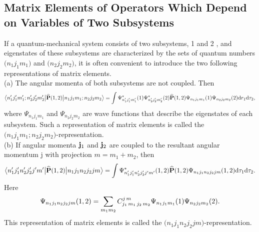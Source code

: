 \subsection{Matrix Elements of Operators Which Depend on Variables of Two Subsystems}\label{sec:13.1.4}
If a quantum-mechanical system consists of two subsystems, 1 and 2 , and eigenstates of these subsystems are characterized by the sets of quantum numbers \(\bigl(n_{1} j_{1} m_{1}\bigr)\) and \(\bigl(n_{2} j_{2} m_{2}\bigr)\), it is often convenient to introduce the two following representations of matrix elements.\\
(a) The angular momenta of both subsystems are not coupled. Then
\begin{equation}
\bigl\langle n_{1}^{\prime} j_{1}^{\prime} m_{1}^{\prime} ; n_{2}^{\prime} j_{2}^{\prime} m_{2}^{\prime} \big| \widehat{\mathbf{P}}(1,2) \big| n_{1} j_{1} m_{1} ; n_{2} j_{2} m_{2} \bigr\rangle
=\int \Psi_{n_{1}^{\prime} j_{1}^{\prime} m_{1}^{\prime}}^{*}(1) \Psi_{n_{2}^{\prime} j_{2}^{\prime} m_{2}^{\prime}}^{*}(2) \widehat{\mathbf{P}}(1,2) \Psi_{n_{1} j_{1} m_{1}}(1) \Psi_{n_{2} j_{2} m_{2}}(2) \mathrm{d} r_{1} \mathrm{d} \tau_{2}, \label{eq:13:1:20}
\end{equation}
where \(\Psi_{n_{1} j_{1} m_{1}}\) and \(\Psi_{n_{2} j_{2} m_{2}}\) are wave functions that describe the eigenstates of each subsystem. Such a representation of matrix elements is called the \(\bigl(n_{1} j_{1} m_{1} ; n_{2} j_{2} m_{2}\bigr)\)-representation.\\
(b) If angular momenta \(\mathbf{j}_{1}\) and \(\mathbf{j}_{2}\) are coupled to the resultant angular momentum j with projection \(m= m_{1}+m_{2}\), then
\begin{equation}
\bigl\langle  n_{1}^{\prime} j_{1}^{\prime} n_{2}^{\prime} j_{2}^{\prime} j^{\prime} m^{\prime} \big| \widehat{\mathbf{P}}(1,2) \big| n_{1} j_{1} n_{2} j_{2} j m \bigr\rangle=\int \Psi_{n_{1}^{\prime} j_{1}^{\prime} n_{2}^{\prime} j_{2}^{\prime} j^{\prime} m^{\prime}}^{*}(1,2) \widehat{\mathbf{P}}(1,2) \Psi_{n_{1} j_{1} n_{2} j_{2} j m}(1,2) \mathrm{d} \tau_{1} \mathrm{d} \tau_{2}. \label{eq:13:1:21}
\end{equation}
Here
\begin{equation}
\Psi_{n_{1} j_{1} n_{2} j_{2} j m}(1,2)=\sum_{m_{1} m_{2}} 
C_{j_{1}\,m_{1}\,j_{2}\,m_{2}}^{j\,m} \Psi_{n_{1} j_{1} m_{1}}(1) \Psi_{n_{2} j_{2} m_{2}}(2). \label{eq:13:1:22}
\end{equation}
This representation of matrix elements is called the \(\bigl(n_{1} j_{1} n_{2} j_{2} j m\bigr)\)-representation.

